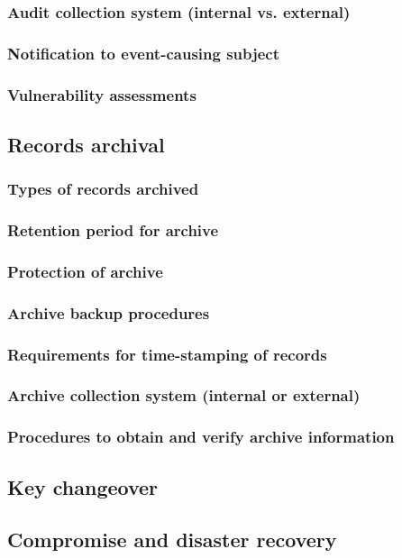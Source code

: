 \documentclass[10pt]{article}
\begin{document}
\subsubsection{Audit collection system (internal vs. external)}
\subsubsection{Notification to event-causing subject}
\subsubsection{Vulnerability assessments}
\subsection{Records archival}
\subsubsection{Types of records archived}
\subsubsection{Retention period for archive}
\subsubsection{Protection of archive}
\subsubsection{Archive backup procedures}
\subsubsection{Requirements for time-stamping of records}
\subsubsection{Archive collection system (internal or external)}
\subsubsection{Procedures to obtain and verify archive information}
\subsection{Key changeover}
\subsection{Compromise and disaster recovery}
\end{document}

